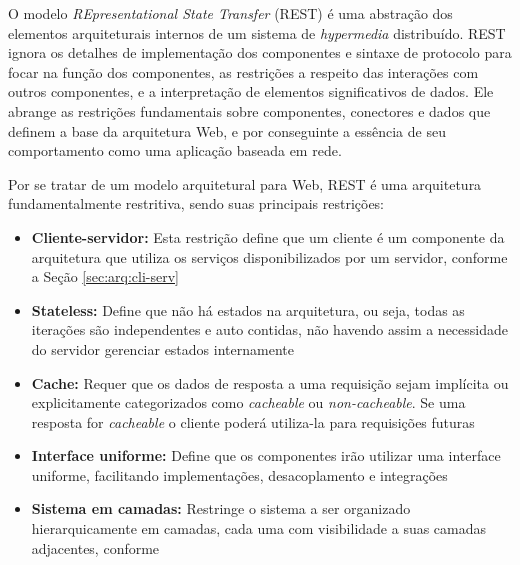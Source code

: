 \begin{citacao}
O modelo \textit{REpresentational State Transfer} (REST) é uma abstração dos elementos arquiteturais internos de um sistema de \textit{hypermedia} distribuído. REST ignora os detalhes de implementação dos componentes e sintaxe de protocolo para focar na função dos componentes, as restrições a respeito das interações com outros componentes, e a interpretação de elementos significativos de dados. Ele abrange as restrições fundamentais sobre componentes, conectores e dados que definem a base da arquitetura Web, e por conseguinte a essência de seu comportamento como uma aplicação baseada em rede.
\end{citacao}

Por se tratar de um modelo arquitetural para Web, REST é uma arquitetura fundamentalmente restritiva, sendo suas principais restrições:

\begin{itemize}
    \item \textbf{Cliente-servidor: }Esta restrição define que um cliente é um componente da arquitetura que utiliza os serviços disponibilizados por um servidor, conforme a Seção \ref{sec:arq:cli-serv}
    
    \item \textbf{Stateless: }Define que não há estados na arquitetura, ou seja, todas as iterações são independentes e auto contidas, não havendo assim a necessidade do servidor gerenciar estados internamente
    
    \item \textbf{Cache: }Requer que os dados de resposta a uma requisição sejam implícita ou explicitamente categorizados como \textit{cacheable} ou \textit{non-cacheable}. Se uma resposta for \textit{cacheable} o cliente poderá utiliza-la para requisições futuras
    
    \item \textbf{Interface uniforme: }Define que os componentes irão utilizar uma interface uniforme, facilitando implementações, desacoplamento e integrações
    
    \item \textbf{Sistema em camadas: }Restringe o sistema a ser organizado hierarquicamente em camadas, cada uma com visibilidade a suas camadas adjacentes, conforme \cite{garlan:1993}
\end{itemize}

